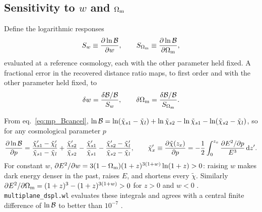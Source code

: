 \subsection{Sensitivity to $w$ and $\Omega_{\mathrm{m}}$}

Define the logarithmic responses
\begin{equation}
  S_w \equiv \frac{\partial \ln\mathcal{B}}{\partial w},\qquad
  S_{\Omega_{\mathrm{m}}}\equiv\frac{\partial \ln\mathcal{B}}{\partial \Omega_{\mathrm{m}}},
  \label{eq:mp_S}
\end{equation}
evaluated at a reference cosmology, each with the other parameter held
fixed.  A fractional error in the recovered distance ratio maps, to
first order and with the other parameter held fixed, to
\begin{equation}
  \delta w = \frac{\delta\mathcal{B}/\mathcal{B}}{S_w},\qquad
  \delta\Omega_{\mathrm{m}} = \frac{\delta\mathcal{B}/\mathcal{B}}{S_{\Omega_{\mathrm{m}}}} .
  \label{eq:mp_propagate}
\end{equation}

\begin{derivation}
From eq.~\eqref{eq:mp_Bcancel},
$\ln\mathcal{B}=\ln(\tilde\chi_{s1}-\tilde\chi_l)+\ln\tilde\chi_{s2}
-\ln\tilde\chi_{s1}-\ln(\tilde\chi_{s2}-\tilde\chi_l)$,
so for any cosmological parameter $p$
\[
  \frac{\partial \ln\mathcal{B}}{\partial p}=\frac{\tilde\chi'_{s1}-\tilde\chi'_l}{\tilde\chi_{s1}-\tilde\chi_l}
   +\frac{\tilde\chi'_{s2}}{\tilde\chi_{s2}}-\frac{\tilde\chi'_{s1}}{\tilde\chi_{s1}}
   -\frac{\tilde\chi'_{s2}-\tilde\chi'_l}{\tilde\chi_{s2}-\tilde\chi_l},
  \qquad
  \tilde\chi'_x\equiv\frac{\partial \tilde\chi(z_x)}{\partial p}
   =-\frac12\int_0^{z_x}\frac{\partial E^2/\partial p}{E^3}\,\dd z' .
\]
For constant $w$,
$\partial E^2/\partial w=3(1-\Omega_{\mathrm{m}})(1+z)^{3(1+w)}\ln(1+z)>0$: raising
$w$ makes dark energy denser in the past, raises $E$, and shortens every
$\tilde\chi$.  Similarly
$\partial E^2/\partial\Omega_{\mathrm{m}}=(1+z)^3-(1+z)^{3(1+w)}>0$ for $z>0$ and
$w<0$ .  \texttt{multiplane\_dspl.wl} evaluates these integrals
and agrees with a central finite difference of $\ln\mathcal{B}$ to better than
$10^{-7}$ .
\end{derivation}

